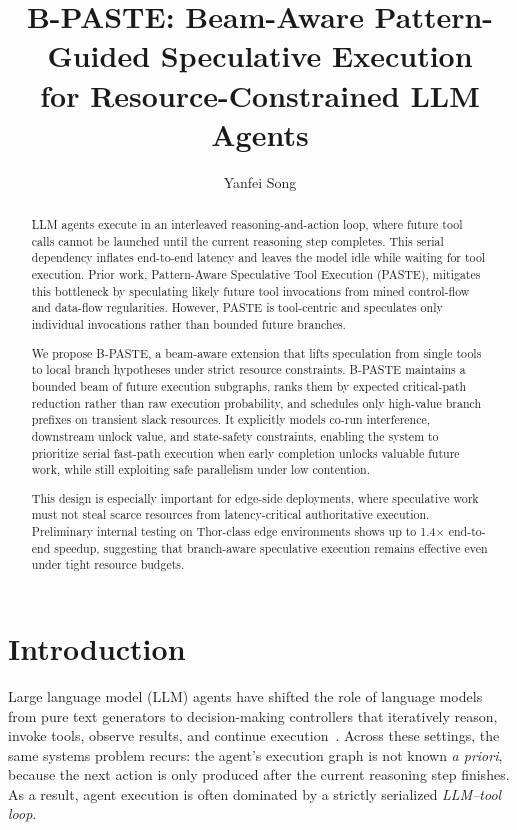 \documentclass[10pt,twocolumn]{article}
\title{\textbf{B-PASTE: Beam-Aware Pattern-Guided Speculative Execution\\
for Resource-Constrained LLM Agents}}
\author[1]{Yanfei Song}
\affil[1]{Independent Researcher\\\texttt{SYanF@buaa.edu.cn}}
\date{}
\begin{document}
\maketitle

\begin{abstract}
LLM agents execute in an interleaved reasoning-and-action loop, where future tool calls cannot be launched until the current reasoning step completes. This serial dependency inflates end-to-end latency and leaves the model idle while waiting for tool execution. Prior work, Pattern-Aware Speculative Tool Execution (PASTE), mitigates this bottleneck by speculating likely future tool invocations from mined control-flow and data-flow regularities. However, PASTE is tool-centric and speculates only individual invocations rather than bounded future branches.

We propose B-PASTE, a beam-aware extension that lifts speculation from single tools to local branch hypotheses under strict resource constraints. B-PASTE maintains a bounded beam of future execution subgraphs, ranks them by expected critical-path reduction rather than raw execution probability, and schedules only high-value branch prefixes on transient slack resources. It explicitly models co-run interference, downstream unlock value, and state-safety constraints, enabling the system to prioritize serial fast-path execution when early completion unlocks valuable future work, while still exploiting safe parallelism under low contention.

This design is especially important for edge-side deployments, where speculative work must not steal scarce resources from latency-critical authoritative execution. Preliminary internal testing on Thor-class edge environments shows up to 1.4× end-to-end speedup, suggesting that branch-aware speculative execution remains effective even under tight resource budgets.
\end{abstract}

\section{Introduction}

Large language model (LLM) agents have shifted the role of language models from pure text generators to decision-making controllers that iteratively reason, invoke tools, observe results, and continue execution~\cite{react,toolformer,openhands}. Across these settings, the same systems problem recurs: the agent's execution graph is not known \emph{a priori}, because the next action is only produced after the current reasoning step finishes. As a result, agent execution is often dominated by a strictly serialized \emph{LLM--tool loop}.
\end{document}
